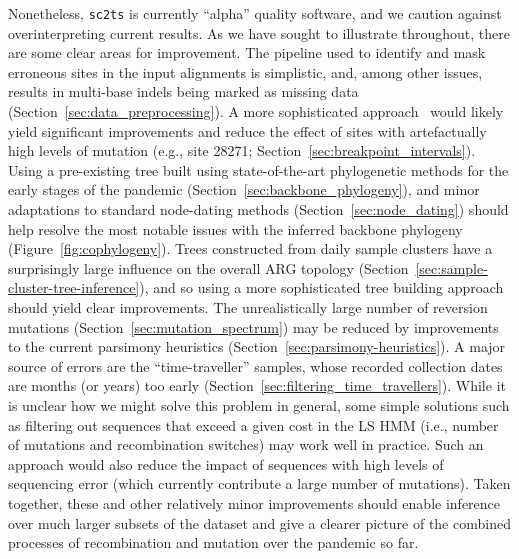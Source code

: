 \documentclass{article}
\begin{document}
Nonetheless, \texttt{sc2ts} is currently ``alpha'' quality software, and
we caution against overinterpreting current results. As we have sought
to illustrate throughout, there are some clear areas for improvement.
The pipeline used to identify and
mask erroneous sites in the input alignments is simplistic, and, among
other issues, results in multi-base indels being marked as missing data
(Section~\ref{sec:data_preprocessing}). A more sophisticated
approach~\citep[e.g.,][]{Aksamentov2021-hj} would
likely yield significant improvements and reduce the effect of sites with
artefactually high levels of mutation (e.g., site 28271;
Section~\ref{sec:breakpoint_intervals}).
Using a pre-existing tree built using state-of-the-art phylogenetic methods
for the early stages of the pandemic (Section~\ref{sec:backbone_phylogeny}),
and minor adaptations to standard node-dating methods
(Section~\ref{sec:node_dating}) should help resolve the most notable issues with
the inferred backbone phylogeny (Figure~\ref{fig:cophylogeny}).
Trees constructed from daily sample clusters have a surprisingly large
influence on the overall ARG topology
(Section~\ref{sec:sample-cluster-tree-inference}), and so using a more
sophisticated tree building approach should yield clear improvements.
The unrealistically large number of reversion mutations
(Section~\ref{sec:mutation_spectrum}) may be reduced by
improvements to the current parsimony
heuristics (Section~\ref{sec:parsimony-heuristics}).
A major source of errors are the ``time-traveller'' samples, whose
recorded collection dates are months (or years) too early
(Section~\ref{sec:filtering_time_travellers}).
While it is unclear how
we might solve this problem in general, some simple solutions such
as filtering out sequences that exceed a given cost in the LS HMM
(i.e., number of mutations and recombination switches) may work well
in practice. Such an approach would also reduce the impact of sequences
with high levels of sequencing error (which currently contribute a large number of
mutations).
Taken together, these and other relatively minor improvements should
enable inference over much larger subsets of the dataset and
give a clearer picture of the combined processes of recombination and
mutation over the pandemic so far.
\end{document}

